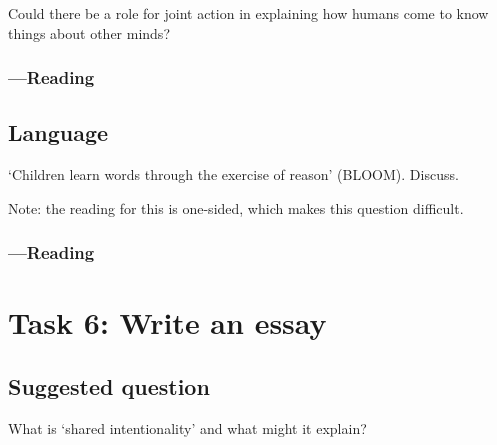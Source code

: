\documentclass[12pt,\papersize]{extarticle}
\begin{document}
Could there be a role for joint action in explaining how humans come to know things about other minds?

\subsubsection{---Reading}







\subsection{Language}
‘Children learn words through the exercise of reason’ (BLOOM).  Discuss.

Note: the reading for this is one-sided, which makes this question difficult.


\subsubsection{---Reading}






\subsection{}






\clearpage
\section{Task 6: Write an essay}

\subsection{Suggested question}
What is ‘shared intentionality’ and what might it explain?
\end{document}
